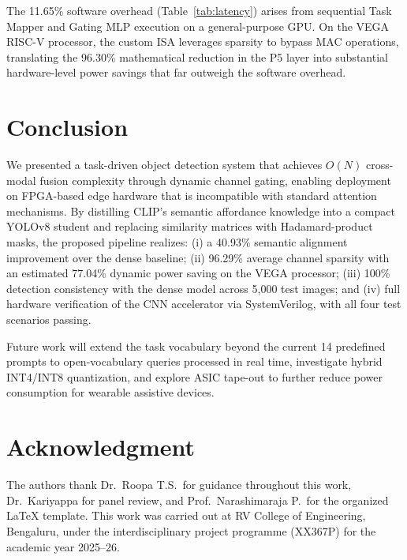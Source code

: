 \documentclass[conference]{IEEEtran}
\begin{document}
The 11.65\% software overhead (Table~\ref{tab:latency}) arises from sequential
Task Mapper and Gating MLP execution on a general-purpose GPU. On the VEGA
RISC-V processor, the custom ISA leverages sparsity to bypass MAC operations,
translating the 96.30\% mathematical reduction in the P5 layer into substantial
hardware-level power savings that far outweigh the software overhead.

\section{Conclusion}

We presented a task-driven object detection system that achieves $O(N)$ cross-modal
fusion complexity through dynamic channel gating, enabling deployment on FPGA-based
edge hardware that is incompatible with standard attention mechanisms. By distilling
CLIP's semantic affordance knowledge into a compact YOLOv8 student and replacing
similarity matrices with Hadamard-product masks, the proposed pipeline realizes:
(i) a 40.93\% semantic alignment improvement over the dense baseline;
(ii) 96.29\% average channel sparsity with an estimated 77.04\% dynamic power saving
on the VEGA processor;
(iii) 100\% detection consistency with the dense model across 5,000 test images; and
(iv) full hardware verification of the CNN accelerator via SystemVerilog, with all
four test scenarios passing.

Future work will extend the task vocabulary beyond the current 14 predefined prompts
to open-vocabulary queries processed in real time, investigate hybrid INT4/INT8 
quantization, and explore ASIC tape-out to further reduce power consumption for
wearable assistive devices.

\section*{Acknowledgment}

The authors thank Dr.\ Roopa T.S.\ for guidance throughout this work, Dr.\ Kariyappa
for panel review, and Prof.\ Narashimaraja P.\ for the organized \LaTeX{} template.
This work was carried out at RV College of Engineering, Bengaluru, under the
interdisciplinary project programme (XX367P) for the academic year 2025--26.
\end{document}
